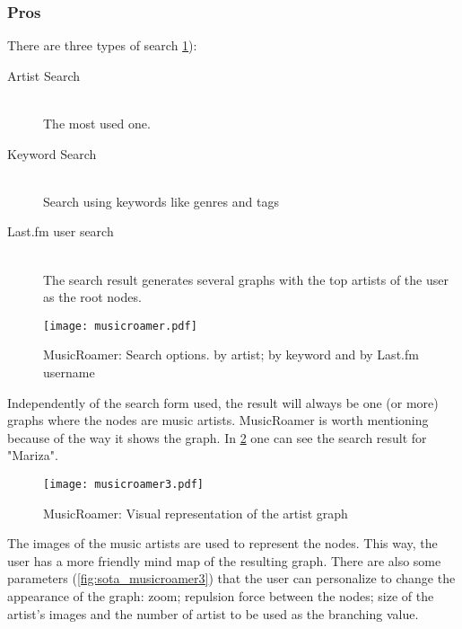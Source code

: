     \subsubsection{Pros} %
    \label{ssub:pros}

      There are three types of search \ref{fig:sota_musicroamer}): 

      \begin{description}
        \item[Artist Search] \hfill \\
          The most used one.
        \item[Keyword Search] \hfill \\
          Search using keywords like genres and tags
        \item[Last.fm user search] \hfill \\
          The search result generates several graphs with the top artists of the user as the root nodes.
      \end{description}

      \begin{figure}[hb]
        \begin{center}
          \texttt{[image: musicroamer.pdf]}
        \end{center}
        \caption{MusicRoamer: Search options. by artist; by keyword and by Last.fm username}
        \label{fig:sota_musicroamer}
      \end{figure}

      Independently of the search form used, the result will always be one (or more) graphs where the nodes are music artists.
      MusicRoamer is worth mentioning because of the way it shows the graph.
      In \ref{fig:sota_musicroamer2} one can see the search result for "Mariza".

      \begin{figure}[H]
        \begin{center}
          \texttt{[image: musicroamer3.pdf]}
        \end{center}
        \caption{MusicRoamer: Visual representation of the artist graph}
        \label{fig:sota_musicroamer2}
      \end{figure}

      The images of the music artists are used to represent the nodes.
      This way, the user has a more friendly mind map of the resulting graph.
      There are also some parameters (\ref{fig:sota_musicroamer3}) that the user can personalize to change the appearance of the graph: zoom; repulsion force between the nodes; size of the artist's images and the number of artist to be used as the branching value.

